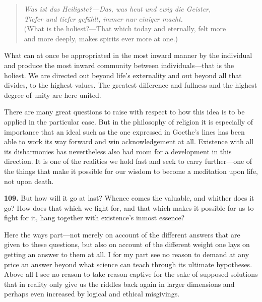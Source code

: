 \documentclass[12pt,a4paper]{book}
\newcommand{\opage}[1]{\marginnote{\footnotesize\textit{[#1]}}}
\begin{document}
\begin{quote}
\textit{Was ist das Heiligste?---Das, was heut und ewig die Geister,}\\
\textit{Tiefer und tiefer gefühlt, immer nur einiger macht.}\\[4pt]
(What is the holiest?---That which today and eternally, felt more\\
and more deeply, makes spirits ever more at one.)
\end{quote}

What can at once be appropriated in the most inward manner by the individual and produce the most inward
community between individuals---that is the holiest. We are directed out beyond life's externality and out
beyond all that divides, to the highest values. The greatest difference and fullness and the highest degree
of unity are here united.

There are many great questions to raise with respect to how this idea is to be applied in the particular
case. But in the philosophy of religion it is especially of importance that an ideal such as the one
expressed in Goethe's lines has been able to work its way forward and win acknowledgement at all. Existence
with all its disharmonies has nevertheless also had room for a development in this direction. It is one of
the realities we hold fast and seek to carry 
\opage{240}further---one of the things that make it possible for our
wisdom to become a meditation upon life, not upon death.

\medskip

\noindent\textbf{109.} But how will it go at last? Whence comes the valuable, and whither does it go? How
does that which we fight for, and that which makes it possible for us to fight for it, hang together with
existence's inmost essence?

Here the ways part---not merely on account of the different answers that are given to these questions, but
also on account of the different weight one lays on getting an answer to them at all. I for my part see no
reason to demand at any price an answer beyond what science can teach through its ultimate hypotheses. Above
all I see no reason to take reason captive for the sake of supposed solutions that in reality only give us
the riddles back again in larger dimensions and perhaps even increased by logical and ethical misgivings.
\end{document}
